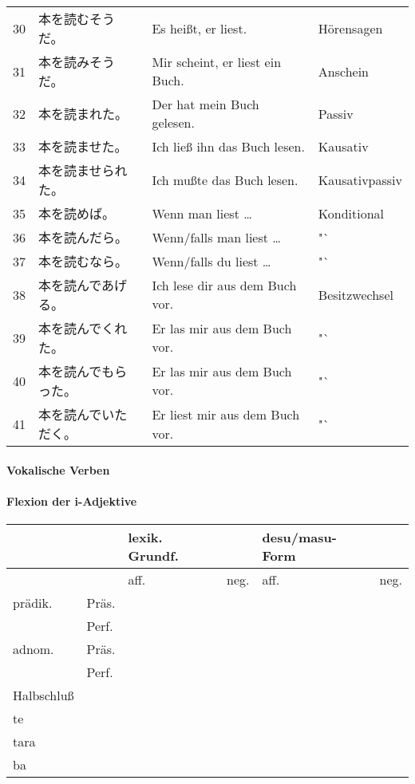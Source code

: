\documentclass[justified, a4paper, notitlepage, captions=tableheading, nobib]{tufte-handout}
\begin{document}
\begin{center}
\begin{tabular}{rlll}
30 & 本を読むそうだ。 & Es heißt, er liest. & Hörensagen\\
31 & 本を読みそうだ。 & Mir scheint, er liest ein Buch. & Anschein\\
32 & 本を読まれた。 & Der hat mein Buch gelesen. & Passiv\\
33 & 本を読ませた。 & Ich ließ ihn das Buch lesen. & Kausativ\\
34 & 本を読ませられた。 & Ich mußte das Buch lesen. & Kausativpassiv\\
35 & 本を読めば。 & Wenn man liest \ldots{} & Konditional\\
36 & 本を読んだら。 & Wenn/falls man liest \ldots{} & "`\\
37 & 本を読むなら。 & Wenn/falls du liest \ldots{} & "`\\
38 & 本を読んであげる。 & Ich lese dir aus dem Buch vor. & Besitzwechsel\\
39 & 本を読んでくれた。 & Er las mir aus dem Buch vor. & "`\\
40 & 本を読んでもらった。 & Er las mir aus dem Buch vor. & "`\\
41 & 本を読んでいただく。 & Er liest mir aus dem Buch vor.　 & "`\\
\end{tabular}
\end{center}

\paragraph{Vokalische Verben}
\label{sec:org170964a}

\paragraph{Flexion der i-Adjektive}
\label{sec:orgc050535}

\begin{center}
\begin{tabular}{llllll}
 &  & lexik. Grundf. &  & desu/masu-Form & \\
\hline
 &  & aff. & neg. & aff. & neg.\\
\hline
prädik. & Präs. &  &  &  & \\
 & Perf. &  &  &  & \\
adnom. & Präs. &  &  &  & \\
 & Perf. &  &  &  & \\
Halbschluß &  &  &  &  & \\
te &  &  &  &  & \\
tara &  &  &  &  & \\
ba &  &  &  &  & \\
\end{tabular}
\end{center}
\end{document}
